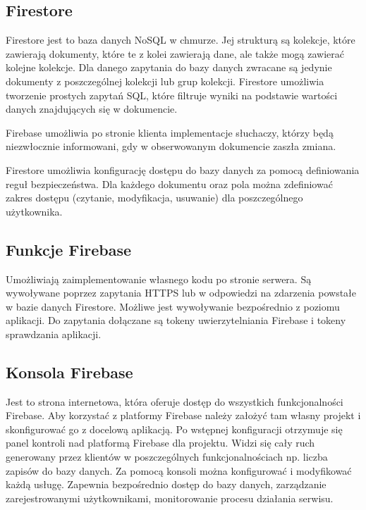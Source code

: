 \subsection{Firestore}

Firestore jest to baza danych NoSQL w chmurze. Jej strukturą są kolekcje, które zawierają dokumenty, które te z kolei zawierają dane, ale także mogą zawierać kolejne kolekcje. 
Dla danego zapytania do bazy danych zwracane są jedynie dokumenty z poszczególnej kolekcji lub grup kolekcji. Firestore umożliwia tworzenie prostych zapytań SQL, które filtruje wyniki na podstawie wartości danych znajdujących się w dokumencie. 

Firebase umożliwia po stronie klienta implementacje słuchaczy, którzy będą niezwłocznie informowani, gdy w obserwowanym dokumencie zaszła zmiana. 

Firestore umożliwia konfigurację dostępu do bazy danych za pomocą definiowania reguł bezpieczeństwa. Dla każdego dokumentu oraz pola można zdefiniować zakres dostępu (czytanie, modyfikacja, usuwanie) dla poszczególnego użytkownika.


\subsection{Funkcje Firebase}

Umożliwiają zaimplementowanie własnego kodu po stronie serwera. Są wywoływane poprzez zapytania HTTPS lub w odpowiedzi na zdarzenia powstałe w bazie danych Firestore. 
Możliwe jest wywoływanie bezpośrednio z poziomu aplikacji. Do zapytania dołączane są tokeny uwierzytelniania Firebase i tokeny sprawdzania aplikacji.

\subsection{Konsola Firebase}

Jest to strona internetowa, która oferuje dostęp do wszystkich funkcjonalności Firebase. Aby korzystać z platformy Firebase należy założyć tam własny projekt i skonfigurować go z docelową aplikacją. Po wstępnej konfiguracji otrzymuje się panel kontroli nad platformą Firebase dla projektu. Widzi się cały ruch generowany przez klientów w poszczególnych funkcjonalnościach np. liczba zapisów do bazy danych. Za pomocą konsoli można konfigurować i modyfikować każdą usługę. Zapewnia bezpośrednio dostęp do bazy danych, zarządzanie zarejestrowanymi użytkownikami, monitorowanie procesu działania serwisu. 

